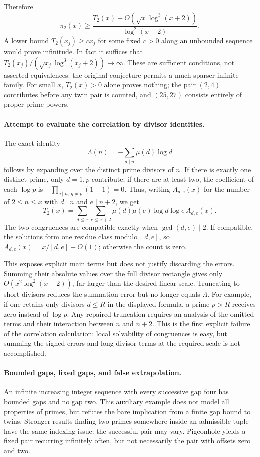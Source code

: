 \documentclass[11pt]{article}
\begin{document}
Therefore
\begin{equation}\label{ra:20:weighted-lower}
 \pi_2(x)\ge
 \frac{T_2(x)-O(\sqrt x\log^3(x+2))}{\log^2(x+2)}.
\end{equation}
A lower bound $T_2(x_j)\ge c x_j$ for some fixed $c>0$ along an
unbounded sequence would prove infinitude. In fact it suffices that
$T_2(x_j)/(\sqrt{x_j}\log^3(x_j+2))\to\infty$.
These are sufficient conditions, not asserted equivalences: the original
conjecture permits a much sparser infinite family. For small $x$,
$T_2(x)>0$ alone proves nothing; the pair $(2,4)$ contributes before
any twin pair is counted, and $(25,27)$ consists entirely of proper
prime powers.

\paragraph{Attempt to evaluate the correlation by divisor identities.}
The exact identity
\[
 \Lambda(n)=-\sum_{d\mid n}\mu(d)\log d
\]
follows by expanding over the distinct prime divisors of $n$. If there
is exactly one distinct prime, only $d=1,p$ contribute; if there are
at least two, the coefficient of each $\log p$ is
$-\prod_{q\mid n,\ q\ne p}(1-1)=0$.
Thus, writing $A_{d,e}(x)$ for the number of $2\le n\le x$ with
$d\mid n$ and $e\mid n+2$, we get
\[
 T_2(x)=\sum_{d\le x}\sum_{e\le x+2}
                  \mu(d)\mu(e)\log d\log e\,A_{d,e}(x).
\]
The two congruences are compatible exactly when $\gcd(d,e)\mid2$.
If compatible, the solutions form one residue class modulo $[d,e]$,
so $A_{d,e}(x)=x/[d,e]+O(1)$; otherwise the count is zero.

This exposes explicit main terms but does not justify discarding the
errors. Summing their absolute values over the full divisor rectangle
gives only $O(x^2\log^2(x+2))$, far larger than the desired linear
scale. Truncating to short divisors reduces the summation error but no
longer equals $\Lambda$. For example, if one retains only divisors
$d\le R$ in the displayed formula, a prime $p>R$ receives zero instead
of $\log p$. Any repaired truncation requires an analysis of the omitted
terms and their interaction between $n$ and $n+2$.
This is the first explicit failure of the correlation calculation: local
solvability of congruences is easy, but summing the signed errors and
long-divisor terms at the required scale is not accomplished.

\paragraph{Bounded gaps, fixed gaps, and false extrapolation.}
An infinite increasing integer sequence with every successive gap four
has bounded gaps and no gap two. This auxiliary example does not model
all properties of primes, but refutes the bare implication from a
finite gap bound to twins. Stronger results finding two primes somewhere
inside an admissible tuple have the same indexing issue: the successful
pair may vary. Pigeonhole yields a fixed pair recurring infinitely often,
but not necessarily the pair with offsets zero and two.
\end{document}
